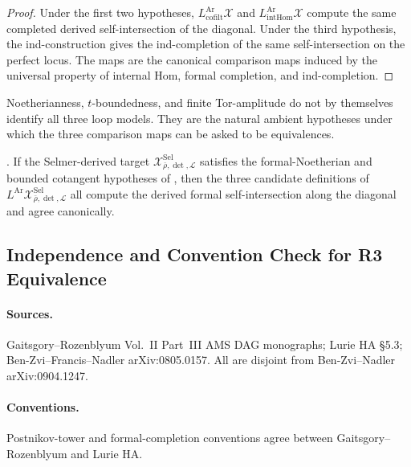 \begin{proof}
Under the first two hypotheses,
\(L^{\mathrm{Ar}}_{\mathrm{cofilt}}\mathcal X\) and
\(L^{\mathrm{Ar}}_{\mathrm{intHom}}\mathcal X\) compute the same
completed derived self-intersection of the diagonal. Under the third
hypothesis, the ind-construction gives the ind-completion of the same
self-intersection on the perfect locus. The maps are the canonical
comparison maps induced by the universal property of internal Hom,
formal completion, and ind-completion.
\end{proof}

\begin{remark}
\label{v4-arith:bzn-rcompletion:rem:hyp-failures}
Noetherianness, \(t\)-boundedness, and finite Tor-amplitude do not by
themselves identify all three loop models. They are the natural
ambient hypotheses under which the three comparison maps can be
asked to be equivalences.
\end{remark}

\begin{corollary}
\label{v4-arith:bzn-rcompletion:cor:R3-for-EG}
\ClaimStatusNeedsVerification. If the Selmer-derived target
\(\mathcal{X}^{\mathrm{Sel}}_{\bar\rho,\det,\mathcal{L}}\) satisfies
the formal-Noetherian and bounded cotangent hypotheses of
, then the three
candidate definitions of
\(L^{\mathrm{Ar}}\mathcal{X}^{\mathrm{Sel}}_{\bar\rho,\det,\mathcal{L}}\)
all compute the derived formal self-intersection along the diagonal
and agree canonically.
\end{corollary}

\subsection{Independence and Convention Check for R3 Equivalence}

\paragraph{Sources.} Gaitsgory--Rozenblyum Vol.~II Part~III
AMS DAG monographs; Lurie HA \S 5.3; Ben-Zvi--Francis--Nadler
arXiv:0805.0157. All are disjoint from Ben-Zvi--Nadler
arXiv:0904.1247.

\paragraph{Conventions.} Postnikov-tower and formal-completion
conventions agree between Gaitsgory--Rozenblyum and Lurie HA.

